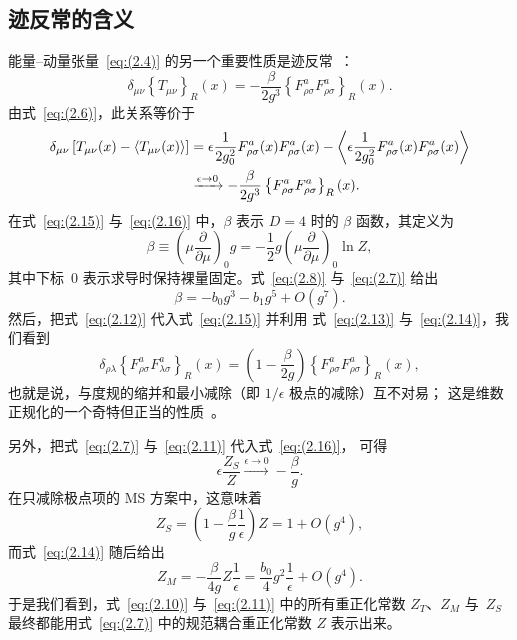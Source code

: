 \subsection{迹反常的含义}
能量--动量张量~\eqref{eq:(2.4)} 的另一个重要性质是迹反常~\cite{Adler:1976zt,%
Nielsen:1977sy,Collins:1976yq}：
\begin{equation}
   \delta_{\mu\nu}\left\{T_{\mu\nu}\right\}_R(x)
   =-\frac{\beta}{2g^3}
   \left\{F_{\rho\sigma}^aF_{\rho\sigma}^a\right\}_R(x).
\label{eq:(2.15)}
\end{equation}
由式~\eqref{eq:(2.6)}，此关系等价于
\begin{align}
   \delta_{\mu\nu}
   \left[T_{\mu\nu}(x)-\left\langle T_{\mu\nu}(x)\right\rangle\right]
   &=\epsilon\frac{1}{2g_0^2}
   F_{\rho\sigma}^a(x)F_{\rho\sigma}^a(x)
   -\left\langle\epsilon\frac{1}{2g_0^2}
   F_{\rho\sigma}^a(x)F_{\rho\sigma}^a(x)\right\rangle
\notag\\
   &\xrightarrow{\epsilon\to0}
   -\frac{\beta}{2g^3}
   \left\{F_{\rho\sigma}^aF_{\rho\sigma}^a\right\}_R(x).
\label{eq:(2.16)}
\end{align}
在式~\eqref{eq:(2.15)} 与~\eqref{eq:(2.16)} 中，$\beta$ 表示 $D=4$ 时的
$\beta$ 函数，其定义为
\begin{equation}
   \beta\equiv\left(\mu\frac{\partial}{\partial\mu}\right)_0g
   =-\frac{1}{2}g\left(\mu\frac{\partial}{\partial\mu}\right)_0\ln Z,
\label{eq:(2.17)}
\end{equation}
其中下标~$0$ 表示求导时保持裸量固定。式~\eqref{eq:(2.8)} 与~\eqref{eq:(2.7)}
给出
\begin{equation}
   \beta=-b_0g^3-b_1g^5+O(g^7).
\label{eq:(2.18)}
\end{equation}
然后，把式~\eqref{eq:(2.12)} 代入式~\eqref{eq:(2.15)} 并利用
式~\eqref{eq:(2.13)} 与~\eqref{eq:(2.14)}，我们看到
\begin{equation}
   \delta_{\rho\lambda}
   \left\{F_{\rho\sigma}^aF_{\lambda\sigma}^a\right\}_R(x)
   =\left(1-\frac{\beta}{2g}\right)
   \left\{F_{\rho\sigma}^aF_{\rho\sigma}^a\right\}_R(x),
\label{eq:(2.19)}
\end{equation}
也就是说，与度规的缩并和最小减除（即 $1/\epsilon$ 极点的减除）互不对易；
这是维数正规化的一个奇特但正当的性质~\cite{Collins:1984xc}。

另外，把式~\eqref{eq:(2.7)} 与~\eqref{eq:(2.11)} 代入式~\eqref{eq:(2.16)}，
可得
\begin{equation}
   \epsilon\frac{Z_S}{Z}
   \xrightarrow{\epsilon\to0}
   -\frac{\beta}{g}.
\label{eq:(2.20)}
\end{equation}
在只减除极点项的 MS 方案中，这意味着
\begin{equation}
   Z_S=\left(1-\frac{\beta}{g}\frac{1}{\epsilon}\right)Z
   =1+O(g^4),
\label{eq:(2.21)}
\end{equation}
而式~\eqref{eq:(2.14)} 随后给出
\begin{equation}
   Z_M=-\frac{\beta}{4g}Z\frac{1}{\epsilon}
   =\frac{b_0}{4}g^2\frac{1}{\epsilon}+O(g^4).
\label{eq:(2.22)}
\end{equation}
于是我们看到，式~\eqref{eq:(2.10)} 与~\eqref{eq:(2.11)} 中的所有重正化常数
$Z_T$、$Z_M$ 与~$Z_S$ 最终都能用式~\eqref{eq:(2.7)} 中的规范耦合重正化常数
$Z$ 表示出来。
